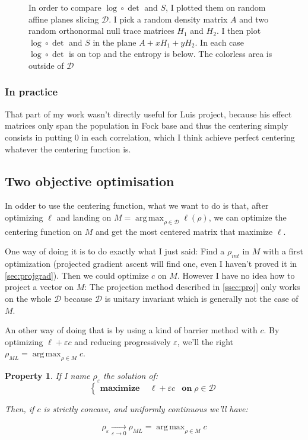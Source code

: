 \documentclass[10pt,a4paper]{report}
\theoremstyle{plain}
\newtheorem{prop}[thm]{Property}
\theoremstyle{definition}
\theoremstyle{remark}
\DeclareMathOperator{\argmax}{arg\,max}
\newcommand{\ml}{_{M\!L}}
\newcommand{\maximf}[2]{\begin{cases}
    \mathbf{maximize}\,\quad #1& \mathbf{on}\; #2
  \end{cases}}
\begin{document}
\begin{figure}
\caption{In order to compare $\log \circ \det$ and $S$, I plotted them on random affine planes
slicing $\mathcal{D}$. I pick a random density matrix $A$ and two random orthonormal null
trace matrices $H_1$ and $H_2$. I then plot $\log \circ \det$ and $S$ in the
plane $A + x H_1 + y H_2$. In each case $\log\circ \det$ is on top and the
entropy is below. The colorless area is outside of $\mathcal{D}$}
\label{fig:heat}
\end{figure}

\subsubsection{In practice}

That part of my work wasn't directly useful for Luis project, because his effect
matrices only span the population in Fock base and thus the centering simply
consists in putting $0$ in each correlation, which I think achieve perfect centering
whatever the centering function is.

\subsection{Two objective optimisation}

In odder to use the centering function, what we want to do is that, after
optimizing $\ell$ and landing on $M = \argmax_{\rho \in \mathcal{D}} \ell(\rho)$, we
can optimize the centering function on $M$ and get the most centered matrix that
maximize $\ell$.

One way of doing it is to do exactly what I just said: Find a $\rho_{int}$ in
$M$ with a first optimization (projected gradient ascent will find one, even I
haven't proved it in \cref{sec:projgrad}). Then we could optimize $c$ on $M$.
However I have no idea how to project a vector on $M$: The projection method
described in \cref{ssec:proj} only works on the whole $\mathcal{D}$ because
$\mathcal{D}$ is unitary invariant which is generally not the case of $M$.

An other way of doing that is by using a kind of barrier method with $c$. By optimizing $\ell +
\varepsilon c$ and reducing progressively $\varepsilon$, we'll the right
$\rho\ml = \argmax_{\rho \in M} c$.

\begin{prop}
  If I name $\rho_\varepsilon$ the solution of:
  \[\maximf{\ell + \varepsilon c}{\rho \in \mathcal{D}}\]

  Then, if $c$ is strictly concave, and uniformly continuous we'll have:

  \[ \rho_\varepsilon \xrightarrow[\varepsilon \to 0]{} \rho\ml = \argmax_{\rho \in M} c\]
\end{prop}
\end{document}

